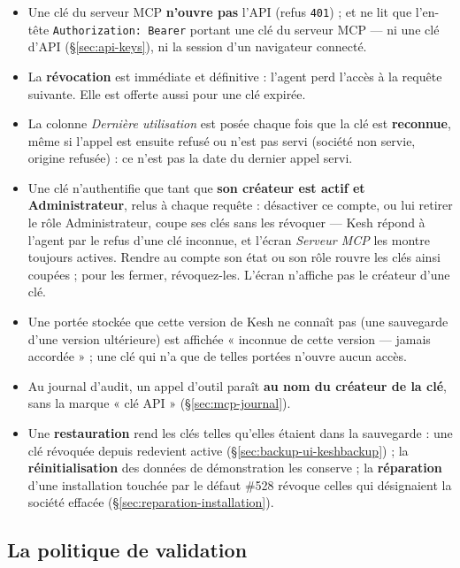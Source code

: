 \documentclass[a4paper,11pt,oneside]{article}
\begin{document}
\begin{itemize}
    \item Une clé du serveur MCP \textbf{n'ouvre pas} l'API  (refus \texttt{401}) ; et  ne lit que l'en-tête \texttt{Authorization: Bearer} portant une clé du serveur MCP --- ni une clé d'API (\S\ref{sec:api-keys}), ni la session d'un navigateur connecté.
    \item La \textbf{révocation} est immédiate et définitive : l'agent perd l'accès à la requête suivante. Elle est offerte aussi pour une clé expirée.
    \item La colonne \emph{Dernière utilisation} est posée chaque fois que la clé est \textbf{reconnue}, même si l'appel est ensuite refusé ou n'est pas servi (société non servie, origine refusée) : ce n'est pas la date du dernier appel servi.
    \item Une clé n'authentifie que tant que \textbf{son créateur est actif et Administrateur}, relus à chaque requête : désactiver ce compte, ou lui retirer le rôle Administrateur, coupe ses clés sans les révoquer --- Kesh répond à l'agent par le refus d'une clé inconnue, et l'écran \emph{Serveur MCP} les montre toujours actives. Rendre au compte son état ou son rôle rouvre les clés ainsi coupées ; pour les fermer, révoquez-les. L'écran n'affiche pas le créateur d'une clé.
    \item Une portée stockée que cette version de Kesh ne connaît pas (une sauvegarde d'une version ultérieure) est affichée « inconnue de cette version --- jamais accordée » ; une clé qui n'a que de telles portées n'ouvre aucun accès.
    \item Au journal d'audit, un appel d'outil paraît \textbf{au nom du créateur de la clé}, sans la marque « clé API » (\S\ref{sec:mcp-journal}).
    \item Une \textbf{restauration} rend les clés telles qu'elles étaient dans la sauvegarde : une clé révoquée depuis redevient active (\S\ref{sec:backup-ui-keshbackup}) ; la \textbf{réinitialisation} des données de démonstration les conserve ; la \textbf{réparation} d'une installation touchée par le défaut \#528 révoque celles qui désignaient la société effacée (\S\ref{sec:reparation-installation}).
\end{itemize}

\subsection{La politique de validation}\label{sec:mcp-validation}
\end{document}
